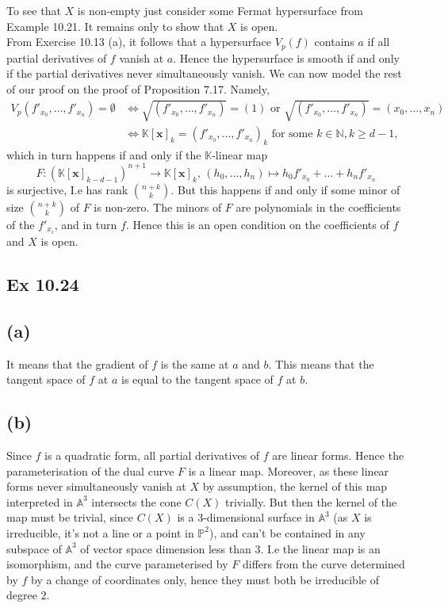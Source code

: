 \documentclass{article}
\theoremstyle{definition}
\newcommand{\K}{\mathbb{K}}
\renewcommand{\P}{\mathbb{P}}
\newcommand{\N}{\mathbb{N}}
\newcommand{\A}{\mathbb{A}}
\newcommand{\Kx}{\K[\bm{x}]}
\renewcommand{\AA}[1]{\A^{#1}}
\newcommand{\PP}[1]{\P^{#1}}
\begin{document}
To see that $X$ is non-empty just consider some Fermat hypersurface
from Example 10.21. It remains only to show that $X$ is open. \\

From Exercise 10.13 (a), it follows that a hypersurface $V_p(f)$ contains $a$
if all partial derivatives of $f$ vanish at $a$. Hence the hypersurface is
smooth if and only if the partial derivatives never simultaneously vanish. We
can now model the rest of our proof on the proof of Proposition 7.17. Namely,
\begin{align*}
	V_p(f'_{x_0}, \ldots, f'_{x_n}) = \emptyset 
	&\Leftrightarrow
	\sqrt{(f'_{x_0}, \ldots, f'_{x_n})} = (1)
	\text{ or }
	\sqrt{(f'_{x_0}, \ldots, f'_{x_n})} = (x_0, \ldots, x_n) \\
	&\Leftrightarrow
	\Kx_k = (f'_{x_0}, \ldots, f'_{x_n})_k \text{ for some } k \in \N, k \geq d - 1,
\end{align*}
which in turn happens if and only if the $\K$-linear map 
\[
	F: (\Kx_{k - d - 1})^{n + 1}
	\to
	\Kx_{k},\, 
	(h_0, \ldots, h_{n})
	\mapsto
	h_0f'_{x_0} + \ldots + h_{n} f'_{x_n}
\] 
is surjective, I.e has rank $\binom{n + k}{k}$. But this happens if and only if
some minor of size $\binom{n + k}{k}$ of $F$ is non-zero. The minors of $F$ are
polynomials in the coefficients of the $f'_{x_i}$, and in turn $f$. Hence this
is an open condition on the coefficients of $f$ and $X$ is open.

\subsection*{Ex 10.24}

\subsection*{(a)}

It means that the gradient of $f$ is the same at $a$ and $b$. This means that
the tangent space of $f$ at $a$ is equal to the tangent space of $f$ at $b$.

\subsection*{(b)}

Since $f$ is a quadratic form, all partial derivatives of $f$ are linear forms.
Hence the parameterisation of the dual curve $F$ is a linear map. Moreover, as
these linear forms never simultaneously vanish at $X$ by assumption, the kernel
of this map interpreted in $\AA{3}$ intersects the cone $C(X)$ trivially. But
then the kernel of the map must be trivial, since $C(X)$ is a $3$-dimensional
surface in $\AA{3}$ (as $X$ is irreducible, it's not a line or a point in
$\PP{2}$), and can't be contained in any subspace of $\AA{3}$ of vector space
dimension less than $3$. I.e the linear map is an isomorphism, and the curve
parameterised by $F$ differs from the curve determined by $f$ by a change of
coordinates only, hence they must both be irreducible of degree $2$. \\
\end{document}

